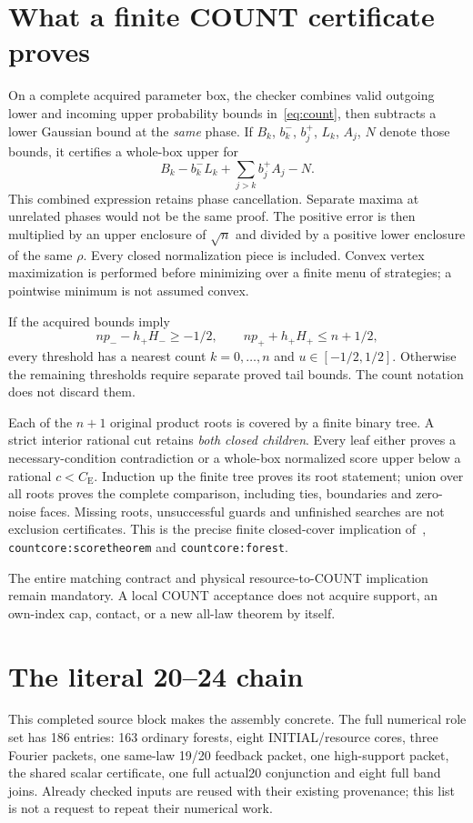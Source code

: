 \documentclass[11pt,a4paper]{article}
\newcommand{\CE}{C_{\mathrm E}}
\begin{document}
\section{What a finite COUNT certificate proves}
On a complete acquired parameter box, the checker combines valid outgoing
lower and incoming upper probability bounds in~\eqref{eq:count}, then
subtracts a lower Gaussian bound at the \emph{same} phase. If \(B_k\),
\(b_k^-\), \(b_j^+\), \(L_k\), \(A_j\), \(N\) denote those bounds, it
certifies a whole-box upper for
\[
 B_k-b_k^-L_k+\sum_{j>k}b_j^+A_j-N.
\]
This combined expression retains phase cancellation. Separate maxima at
unrelated phases would not be the same proof. The positive error is then
multiplied by an upper enclosure of \(\sqrt n\) and divided by a positive
lower enclosure of the same \(\rho\). Every closed normalization piece is
included. Convex vertex maximization is performed before minimizing over
a finite menu of strategies; a pointwise minimum is not assumed convex.

If the acquired bounds imply
\[
 np_- -h_+H_-\ge-1/2,\qquad np_+ +h_+H_+\le n+1/2,
\]
every threshold has a nearest count \(k=0,\ldots,n\) and
\(u\in[-1/2,1/2]\). Otherwise the remaining thresholds require separate
proved tail bounds. The count notation does not discard them.

Each of the \(n+1\) original product roots is covered by a finite binary
tree. A strict interior rational cut retains \emph{both closed children}.
Every leaf either proves a necessary-condition contradiction or a
whole-box normalized score upper below a rational \(c<\CE\).
Induction up the finite tree proves its root statement; union over all
roots proves the complete comparison, including ties, boundaries and
zero-noise faces. Missing roots, unsuccessful guards and unfinished
searches are not exclusion certificates. This is the precise finite
closed-cover implication of~\cite{source},
\texttt{countcore:scoretheorem} and \texttt{countcore:forest}.

The entire matching contract and physical resource-to-COUNT implication
remain mandatory. A local COUNT acceptance does not acquire support,
an own-index cap, contact, or a new all-law theorem by itself.

\section{The literal 20--24 chain}
This completed source block makes the assembly concrete.
The full numerical role set has 186 entries:
163 ordinary forests, eight INITIAL/resource cores, three Fourier packets,
one same-law 19/20 feedback packet, one high-support packet, the shared
scalar certificate, one full actual20 conjunction and eight full band joins.
Already checked inputs are reused with their existing provenance; this
list is not a request to repeat their numerical work.
\end{document}
